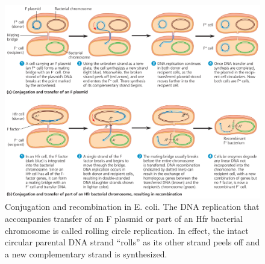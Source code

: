 \documentclass[
  ignorenonframetext,
  aspectratio=169]{beamer}
\begin{document}
\begin{frame}{}
\protect\hypertarget{section}{}
\begin{figure}
\includegraphics[width=0.6\linewidth]{./../images/bacterial_conjugation2} \caption{Conjugation and recombination in E. coli. The DNA replication that accompanies transfer of an F plasmid or part of an Hfr bacterial chromosome is called rolling circle replication. In effect, the intact circular parental DNA strand “rolls” as its other strand peels off and a new complementary strand is synthesized.}\label{fig:conjugation2}
\end{figure}
\end{frame}
\end{document}
